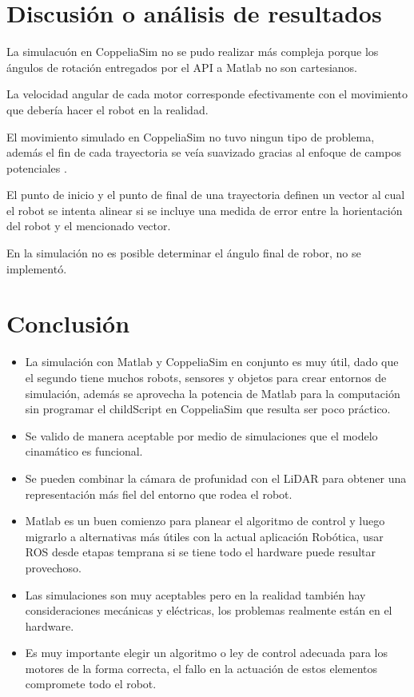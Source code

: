 \documentclass[conference]{IEEEtran}
\begin{document}
\section{Discusión o análisis de resultados}
La simulacuón en CoppeliaSim no se pudo realizar más compleja porque los ángulos de rotación
entregados por el API a Matlab no son cartesianos.


La velocidad angular de cada motor corresponde efectivamente con el movimiento que debería
hacer el robot en la realidad.

El movimiento simulado en CoppeliaSim no tuvo ningun tipo de problema, además el fin de cada
trayectoria se veía suavizado gracias al enfoque de campos potenciales \cite{gonzalez-villela_cinematica_2015}.

El punto de inicio y el punto de final de una trayectoria definen un vector al cual el robot
se intenta alinear si se incluye una medida de error entre la horientación del robot y el mencionado vector.

En la simulación no es posible determinar el ángulo final de robor, no se implementó.

\section{Conclusión}
\begin{itemize}
  \item La simulación con Matlab y CoppeliaSim en conjunto es muy útil, dado que el 
  segundo tiene muchos robots, sensores y objetos para crear entornos de simulación, 
  además se aprovecha la potencia de Matlab para la computación sin programar el 
  childScript en CoppeliaSim que resulta ser poco práctico.
  \item Se valido de manera aceptable por medio de simulaciones que el modelo cinamático 
  es funcional.
  \item Se pueden combinar la cámara de profunidad con el LiDAR para obtener una representación
  más fiel del entorno que rodea el robot.
  \item Matlab es un buen comienzo para planear el algoritmo de control y luego migrarlo
  a alternativas más útiles con la actual aplicación Robótica, usar ROS desde etapas
  temprana si se tiene todo el hardware puede resultar provechoso.
  \item Las simulaciones son muy aceptables pero en la realidad también hay consideraciones
  mecánicas y eléctricas, los problemas realmente están en el hardware.
  \item Es muy importante elegir un algoritmo o ley de control adecuada para los motores de 
  la forma correcta, el fallo en la actuación de estos elementos compromete todo el robot.
\end{itemize}
\newpage



\end{document}
